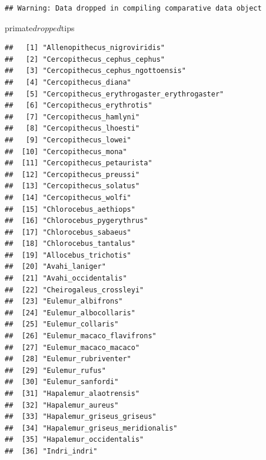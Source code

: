 \documentclass[]{article}
\newenvironment{Shaded}{\begin{snugshade}}{\end{snugshade}}
\newcommand{\NormalTok}[1]{{#1}}
\begin{document}
\begin{verbatim}
## Warning: Data dropped in compiling comparative data object
\end{verbatim}

\begin{Shaded}
\begin{Highlighting}[]
\NormalTok{primate$dropped$tips}
\end{Highlighting}
\end{Shaded}

\begin{verbatim}
##   [1] "Allenopithecus_nigroviridis"                  
##   [2] "Cercopithecus_cephus_cephus"                  
##   [3] "Cercopithecus_cephus_ngottoensis"             
##   [4] "Cercopithecus_diana"                          
##   [5] "Cercopithecus_erythrogaster_erythrogaster"    
##   [6] "Cercopithecus_erythrotis"                     
##   [7] "Cercopithecus_hamlyni"                        
##   [8] "Cercopithecus_lhoesti"                        
##   [9] "Cercopithecus_lowei"                          
##  [10] "Cercopithecus_mona"                           
##  [11] "Cercopithecus_petaurista"                     
##  [12] "Cercopithecus_preussi"                        
##  [13] "Cercopithecus_solatus"                        
##  [14] "Cercopithecus_wolfi"                          
##  [15] "Chlorocebus_aethiops"                         
##  [16] "Chlorocebus_pygerythrus"                      
##  [17] "Chlorocebus_sabaeus"                          
##  [18] "Chlorocebus_tantalus"                         
##  [19] "Allocebus_trichotis"                          
##  [20] "Avahi_laniger"                                
##  [21] "Avahi_occidentalis"                           
##  [22] "Cheirogaleus_crossleyi"                       
##  [23] "Eulemur_albifrons"                            
##  [24] "Eulemur_albocollaris"                         
##  [25] "Eulemur_collaris"                             
##  [26] "Eulemur_macaco_flavifrons"                    
##  [27] "Eulemur_macaco_macaco"                        
##  [28] "Eulemur_rubriventer"                          
##  [29] "Eulemur_rufus"                                
##  [30] "Eulemur_sanfordi"                             
##  [31] "Hapalemur_alaotrensis"                        
##  [32] "Hapalemur_aureus"                             
##  [33] "Hapalemur_griseus_griseus"                    
##  [34] "Hapalemur_griseus_meridionalis"               
##  [35] "Hapalemur_occidentalis"                       
##  [36] "Indri_indri"                                  

\end{verbatim}
\end{document}
